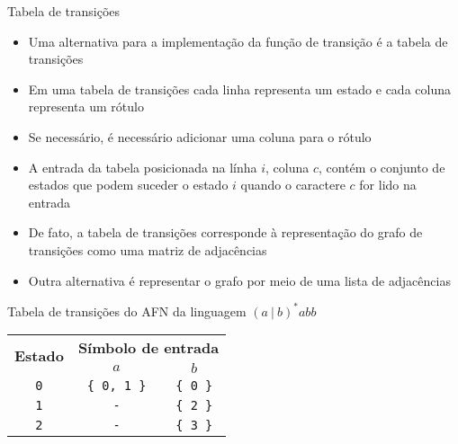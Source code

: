 \begin{frame}[fragile]{Tabela de transições}

    \begin{itemize}
        \item Uma alternativa para a implementação da função de transição é a tabela de transições
        \pause

        \item Em uma tabela de transições cada linha representa um estado e cada coluna representa um rótulo
        \pause

        \item Se necessário, é necessário adicionar uma coluna para o rótulo 
        \pause

        \item A entrada da tabela posicionada na línha $i$, coluna $c$, contém o conjunto de estados que podem suceder o estado $i$ quando o caractere $c$
            for lido na entrada
        \pause

        \item De fato, a tabela de transições corresponde à representação do grafo de transições como uma matriz de adjacências
        \pause

        \item Outra alternativa é representar o grafo por meio de uma lista de adjacências
    \end{itemize}

\end{frame}

\begin{frame}[fragile]{Tabela de transições do AFN da linguagem $(a\ |\ b)^*abb$}

    \begin{table}
        \centering

        \begin{tabular}{ccc}
        \toprule
        \multirow{2}{*}{\textbf{Estado}} & \multicolumn{2}{c}{\textbf{Símbolo de entrada}} \\
        & $a$ & $b$ \\ 
        \midrule
        \texttt{0} & \texttt{\{ 0, 1 \}} & \texttt{\{ 0 \}} \\
        \texttt{1} & \texttt{-} & \texttt{\{ 2 \}} \\
        \texttt{2} & \texttt{-} & \texttt{\{ 3 \}} \\
        \bottomrule
        \end{tabular}
    \end{table}

\end{frame}

